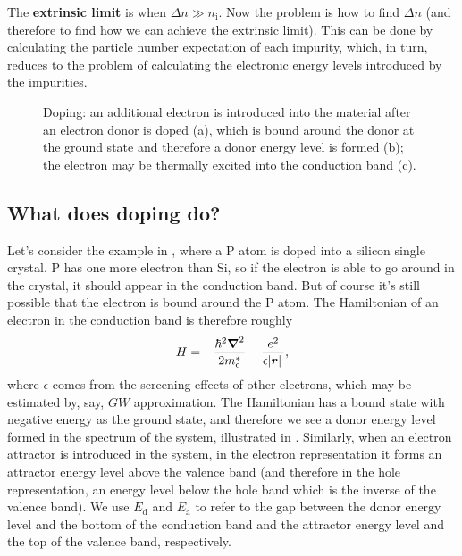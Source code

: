 \documentclass[hyperref, a4paper]{article}
\newcommand*{\concept}[1]{{\textbf{#1}}}
\newcommand{\Ed}{E_{\text{d}}}
\newcommand{\Ea}{E_{\text{a}}}
\begin{document}
The \concept{extrinsic limit} is when $\Delta n \gg n_{\text{i}}$.
Now the problem is how to find $\Delta n$
(and therefore to find how we can achieve the extrinsic limit).
This can be done by calculating the particle number expectation of each impurity,
which, in turn, reduces to the problem 
of calculating the electronic energy levels 
introduced by the impurities.

\begin{figure}
    \centering
    
    \caption{Doping: an additional electron is introduced into the material
    after an electron donor is doped (a), 
    which is bound around the donor at the ground state 
    and therefore a donor energy level is formed (b); 
    the electron may be thermally excited into the conduction band (c).}
    \label{fig:donor}
\end{figure}

\subsection{What does doping do?}

Let's consider the example in ,
where a P atom is doped into a silicon single crystal.
P has one more electron than Si, 
so if the electron is able to go around in the crystal, 
it should appear in the conduction band. 
But of course it's still possible that 
the electron is bound around the P atom.
The Hamiltonian of an electron in the conduction band is therefore roughly 
\begin{equation}
    H = - \frac{\hbar^2 \grad^2}{2 m^*_{\text{c}}} 
    - \frac{e^2}{\epsilon \abs*{\vb*{r}}},
\end{equation}
where $\epsilon$ comes from the screening effects of other electrons, 
which may be estimated by, say, $GW$ approximation.
The Hamiltonian has a bound state with negative energy 
as the ground state, 
and therefore we see a donor energy level formed 
in the spectrum of the system, illustrated in .
Similarly, when an electron attractor is introduced 
in the system, in the electron representation 
it forms an attractor energy level 
above the valence band
(and therefore in the hole representation, 
an energy level below the hole band 
which is the inverse of the valence band).
We use $\Ed$ and $\Ea$ to refer to the gap 
between the donor energy level and the bottom of the conduction band 
and the attractor energy level and the top of the valence band, respectively.
\end{document}
